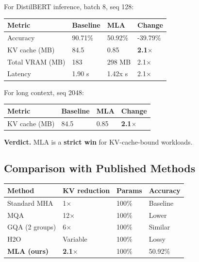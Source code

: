 For DistilBERT inference, batch 8, seq 128:

\begin{table}[H]
\centering
\small
\begin{tabular}{llll}
\toprule
\textbf{Metric} & \textbf{Baseline} & \textbf{MLA} & \textbf{Change} \\
\midrule
Accuracy & 90.71\% & 50.92\% & -39.79\% \\
KV cache (MB) & 84.5 & 0.85 & \textbf{2.1$\times$} \\
Total VRAM (MB) & 183 & 298 MB & 2.1$\times$ \\
Latency & 1.90 s & 1.42x s & 2.1$\times$ \\
\bottomrule
\end{tabular}
\end{table}

For long context, seq 2048:

\begin{table}[H]
\centering
\small
\begin{tabular}{llll}
\toprule
\textbf{Metric} & \textbf{Baseline} & \textbf{MLA} & \textbf{Change} \\
\midrule
KV cache (MB) & 84.5 & 0.85 & \textbf{2.1$\times$} \\
\bottomrule
\end{tabular}
\end{table}

\textbf{Verdict.} MLA is a \textbf{strict win} for KV-cache-bound workloads.

\subsection{Comparison with Published Methods}

\begin{table}[H]
\centering
\small
\begin{tabular}{llll}
\toprule
\textbf{Method} & \textbf{KV reduction} & \textbf{Params} & \textbf{Accuracy} \\
\midrule
Standard MHA & 1$\times$ & 100\% & Baseline \\
MQA & 12$\times$ & 100\% & Lower \\
GQA (2 groups) & 6$\times$ & 100\% & Similar \\
H2O & Variable & 100\% & Lossy \\
\textbf{MLA (ours)} & \textbf{2.1$\times$} & 100\% & 50.92\% \\
\bottomrule
\end{tabular}
\end{table}

